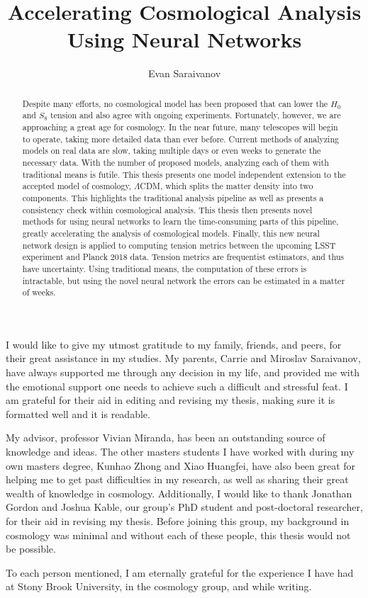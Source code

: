 \documentclass[master,bottom,nosig]{usbthesis}
\author{Evan Saraivanov}%
\title{Accelerating Cosmological Analysis Using Neural Networks}%
\theoremstyle{definition}
\theoremstyle{plain} %
\begin{document}
\singlespacing %
\maketitle %
\makeapproval %

\begin{abstract}
Despite many efforts, no cosmological model has been proposed that can lower the $H_0$ and $S_8$ tension and also agree with ongoing experiments. Fortunately, however, we are approaching a great age for cosmology. In the near future, many telescopes will begin to operate, taking more detailed data than ever before. Current methods of analyzing models on real data are slow, taking multiple days or even weeks to generate the necessary data. With the number of proposed models, analyzing each of them with traditional means is futile. This thesis presents one model independent extension to the accepted model of cosmology, $\Lambda$CDM, which splits the matter density into two components. This highlights the traditional analysis pipeline as well as presents a consistency check within cosmological analysis. This thesis then presents novel methods for using neural networks to learn the time-consuming parts of this pipeline, greatly accelerating the analysis of cosmological models. Finally, this new neural network design is applied to computing tension metrics between the upcoming LSST experiment and Planck 2018 data. Tension metrics are frequentist estimators, and thus have uncertainty. Using traditional means, the computation of these errors is intractable, but using the novel neural network the errors can be estimated in a matter of weeks.
\end{abstract}
\tableofcontents %
\listoffigures %
%
%
\begin{acknowledgements}
I would like to give my utmost gratitude to my family, friends, and peers, for their great assistance in my studies. My parents, Carrie and Miroslav Saraivanov, have always supported me through any decision in my life, and provided me with the emotional support one needs to achieve such a difficult and stressful feat. I am grateful for their aid in editing and revising my thesis, making sure it is formatted well and it is readable. 

My advisor, professor Vivian Miranda, has been an outstanding source of knowledge and ideas. The other masters students I have worked with during my own masters degree, Kunhao Zhong and Xiao Huangfei, have also been great for helping me to get past difficulties in my research, as well as sharing their great wealth of knowledge in cosmology. Additionally, I would like to thank Jonathan Gordon and Joshua Kable, our group's PhD student and post-doctoral researcher, for their aid in revising my thesis. Before joining this group, my background in cosmology was minimal and without each of these people, this thesis would not be possible.

To each person mentioned, I am eternally grateful for the experience I have had at Stony Brook University, in the cosmology group, and while writing.
\end{acknowledgements}
\pagestyle{thesis}
\newpage
{}
\end{document}

